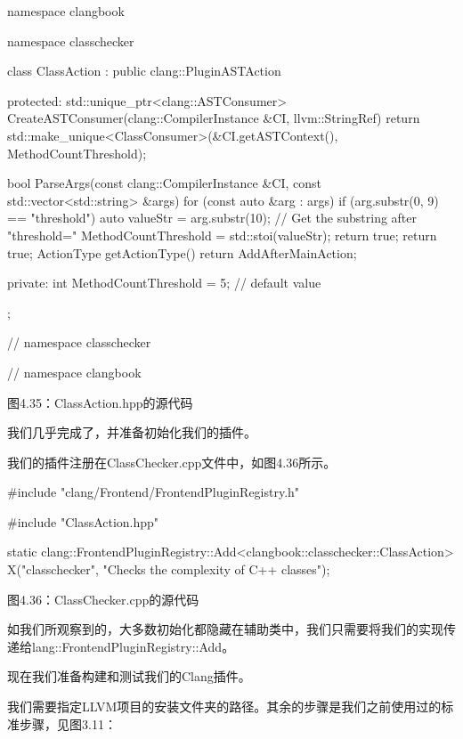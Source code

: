 \begin{cpp}
namespace clangbook {
namespace classchecker {
class ClassAction : public clang::PluginASTAction {
protected:
  std::unique_ptr<clang::ASTConsumer>
  CreateASTConsumer(clang::CompilerInstance &CI, llvm::StringRef) {
    return std::make_unique<ClassConsumer>(&CI.getASTContext(),
                                           MethodCountThreshold);
  }

  bool ParseArgs(const clang::CompilerInstance &CI,
    const std::vector<std::string> &args) {
      for (const auto &arg : args) {
        if (arg.substr(0, 9) == "threshold") {
          auto valueStr = arg.substr(10); // Get the substring after "threshold="
          MethodCountThreshold = std::stoi(valueStr);
          return true;
        }
      }
    return true;
  }
  ActionType getActionType() { return AddAfterMainAction; }

private:
  int MethodCountThreshold = 5; // default value
};
} // namespace classchecker
} // namespace clangbook
\end{cpp}

\begin{center}
图4.35：ClassAction.hpp的源代码
\end{center}

我们几乎完成了，并准备初始化我们的插件。


我们的插件注册在ClassChecker.cpp文件中，如图4.36所示。

\begin{cpp}
#include "clang/Frontend/FrontendPluginRegistry.h"

#include "ClassAction.hpp"

static clang::FrontendPluginRegistry::Add<clangbook::classchecker::ClassAction>
X("classchecker", "Checks the complexity of C++ classes");
\end{cpp}


\begin{center}
图4.36：ClassChecker.cpp的源代码
\end{center}

如我们所观察到的，大多数初始化都隐藏在辅助类中，我们只需要将我们的实现传递给lang::FrontendPluginRegistry::Add。

现在我们准备构建和测试我们的Clang插件。


我们需要指定LLVM项目的安装文件夹的路径。其余的步骤是我们之前使用过的标准步骤，见图3.11：

